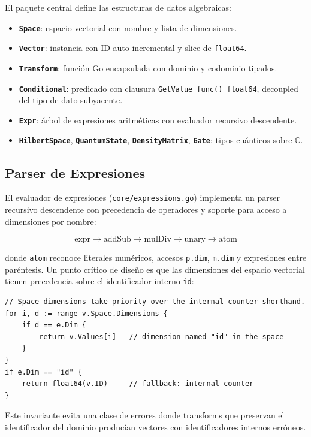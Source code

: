 \documentclass[12pt, a4paper, openany]{report}
\theoremstyle{definition}
\begin{document}
El paquete central define las estructuras de datos algebraicas:

\begin{itemize}
  \item \textbf{\texttt{Space}}: espacio vectorial con nombre y lista de dimensiones.
  \item \textbf{\texttt{Vector}}: instancia con ID auto-incremental y slice de \texttt{float64}.
  \item \textbf{\texttt{Transform}}: función Go encapsulada con dominio y codominio tipados.
  \item \textbf{\texttt{Conditional}}: predicado con clausura \texttt{GetValue~func()~float64}, decoupled del tipo de dato subyacente.
  \item \textbf{\texttt{Expr}}: árbol de expresiones aritméticas con evaluador recursivo descendente.
  \item \textbf{\texttt{HilbertSpace}}, \textbf{\texttt{QuantumState}}, \textbf{\texttt{DensityMatrix}}, \textbf{\texttt{Gate}}: tipos cuánticos sobre $\mathbb{C}$.
\end{itemize}

\subsection{Parser de Expresiones}

El evaluador de expresiones (\texttt{core/expressions.go}) implementa un parser recursivo descendente con precedencia de operadores y soporte para acceso a dimensiones por nombre:

\[
  \text{expr} \to \text{addSub} \to \text{mulDiv} \to \text{unary} \to \text{atom}
\]

donde \texttt{atom} reconoce literales numéricos, accesos \texttt{p.dim}, \texttt{m.dim} y expresiones entre paréntesis. Un punto crítico de diseño es que las dimensiones del espacio vectorial tienen precedencia sobre el identificador interno \texttt{id}:

\begin{lstlisting}[style=go, caption={Prioridad de dimensiones sobre el contador interno}]
// Space dimensions take priority over the internal-counter shorthand.
for i, d := range v.Space.Dimensions {
    if d == e.Dim {
        return v.Values[i]   // dimension named "id" in the space
    }
}
if e.Dim == "id" {
    return float64(v.ID)     // fallback: internal counter
}
\end{lstlisting}

Este invariante evita una clase de errores donde transforms que preservan el identificador del dominio producían vectores con identificadores internos erróneos.
\end{document}
